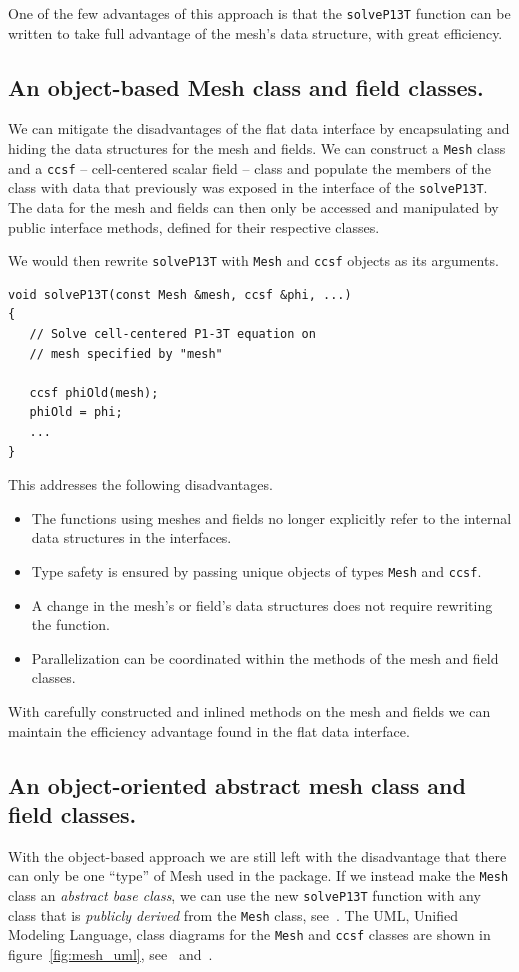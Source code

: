 \documentclass[reqno]{lanl}
\begin{document}
One of the few advantages of this approach is that the \texttt{solveP13T} 
function can be written to take full advantage of the mesh's data structure,
with great efficiency.

\subsection{An object-based Mesh class and field classes.}
We can mitigate the disadvantages of the flat data interface by encapsulating
and hiding the data structures for the mesh and fields.
We can construct a \texttt{Mesh} class and a \texttt{ccsf} -- 
cell-centered scalar field -- class and populate the members of the class with 
data that previously was exposed in the interface of the \texttt{solveP13T}.
The data for the mesh and fields can then only be accessed and manipulated 
by public interface methods, defined for their respective classes.

We would then rewrite \texttt{solveP13T} with \texttt{Mesh} and \texttt{ccsf}
objects as its arguments.
%
 \begin{verbatim}
void solveP13T(const Mesh &mesh, ccsf &phi, ...)
{
   // Solve cell-centered P1-3T equation on
   // mesh specified by "mesh"

   ccsf phiOld(mesh);
   phiOld = phi;
   ...
}
\end{verbatim} \normalcolor

This addresses the following disadvantages.
\begin{itemize}
\item The functions using meshes and fields no longer explicitly refer to
  the internal data structures in the interfaces.
\item Type safety is ensured by passing unique objects of types \texttt{Mesh}
  and \texttt{ccsf}.
\item A change in the mesh's or field's data structures does not require
  rewriting the function.
\item Parallelization can be coordinated within the methods of the mesh
  and field classes.
\end{itemize}

With carefully constructed and inlined methods on the mesh and fields we
can maintain the efficiency advantage found in the flat data interface.

\subsection{An object-oriented abstract mesh class and field classes.}
With the object-based approach
we are still left with the disadvantage that there can
only be one ``type'' of Mesh used in the package.
If we instead make the \texttt{Mesh} class an
\emph{abstract base class}, we can use the 
new \texttt{solveP13T} function with any class that is \emph{publicly derived}
from the \texttt{Mesh} class,
see~\cite{Booch94}.
The UML, Unified Modeling Language,
class diagrams for the \texttt{Mesh}
and \texttt{ccsf} classes are shown in figure~\ref{fig:mesh_uml},
see~\cite{Booch99} and~\cite{Rumbaugh99}.
\end{document}
